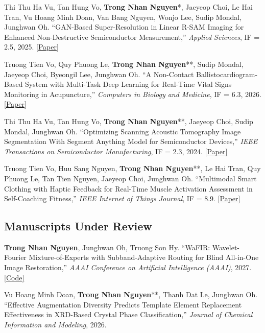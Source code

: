 \documentclass[a4paper,10pt]{extarticle}
\newcommand{\me}{\textbf{Trong Nhan Nguyen}}
\begin{document}
\begin{publist}
    \item[{[J5]}] Thi Thu Ha Vu, Tan Hung Vo, \me*, Jaeyeop Choi, Le Hai Tran, Vu Hoang Minh Doan, Van Bang Nguyen, Wonjo Lee, Sudip Mondal, Junghwan Oh. ``GAN-Based Super-Resolution in Linear R-SAM Imaging for Enhanced Non-Destructive Semiconductor Measurement,'' \textit{Applied Sciences}, IF = 2.5, 2025. \href{https://www.mdpi.com/2076-3417/15/12/6780}{[Paper]}
    \item[{[J6]}] Truong Tien Vo, Quy Phuong Le, \me**, Sudip Mondal, Jaeyeop Choi, Byeongil Lee, Junghwan Oh. ``A Non-Contact Ballistocardiogram-Based System with Multi-Task Deep Learning for Real-Time Vital Signs Monitoring in Acupuncture,'' \textit{Computers in Biology and Medicine}, IF = 6.3, 2026. \href{https://doi.org/10.1016/j.compbiomed.2026.111461}{[Paper]}
    \item[{[J7]}] Thi Thu Ha Vu, Tan Hung Vo, \me**, Jaeyeop Choi, Sudip Mondal, Junghwan Oh. ``Optimizing Scanning Acoustic Tomography Image Segmentation With Segment Anything Model for Semiconductor Devices,'' \textit{IEEE Transactions on Semiconductor Manufacturing}, IF = 2.3, 2024. \href{https://ieeexplore.ieee.org/document/10645767}{[Paper]}
    \item[{[J8]}] Truong Tien Vo, Huu Sang Nguyen, \me**, Le Hai Tran, Quy Phuong Le, Tan Tien Nguyen, Jaeyeop Choi, Junghwan Oh. ``Multimodal Smart Clothing with Haptic Feedback for Real-Time Muscle Activation Assessment in Self-Coaching Fitness,'' \textit{IEEE Internet of Things Journal}, IF = 8.9. \href{https://ieeexplore.ieee.org/document/11666935}{[Paper]}
\end{publist}

\subsection*{Manuscripts Under Review}
\begin{publist}
    \item[{[C2]}] \me, Junghwan Oh, Truong Son Hy. ``WaFIR: Wavelet-Fourier Mixture-of-Experts with Subband-Adaptive Routing for Blind All-in-One Image Restoration,'' \textit{AAAI Conference on Artificial Intelligence (AAAI)}, 2027. \href{https://anonymous.4open.science/r/WaFIR/README.md}{[Code]}
    \item[{[J9]}] Vu Hoang Minh Doan, \me**, Thanh Dat Le, Junghwan Oh. ``Effective Augmentation Diversity Predicts Template Element Replacement Effectiveness in XRD-Based Crystal Phase Classification,'' \textit{Journal of Chemical Information and Modeling}, 2026.
\end{publist}
\end{document}
